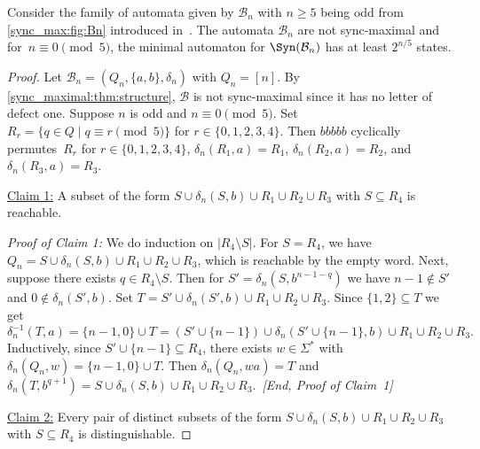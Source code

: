 \begin{theorem} \label{thm:Bn}
	Consider the family of automata given by $\mathcal B_n$ with $n \ge 5$ being odd from \cref{sync_max:fig:Bn}
	introduced in~\cite{AnaVolGus2013,AnanichevVZ07}.
	The automata $\mathcal B_n$ are not sync-maximal 
	and for~$n \equiv 0 \pmod{5}$, 
	the minimal automaton for $\Syn(\mathcal{B}_n)$ 
	has at least $2^{n / 5}$ states.
\end{theorem}
\begin{proof}
	Let $\mathcal{B}_n = (Q_n,\{a,b\},\delta_n)$ with $Q_n = [n]$.
	By \cref{sync_maximal:thm:structure},
	$\mathcal B$ is not sync-maximal since it has no letter of defect one.
	Suppose $n$ is odd and $n \equiv 0 \pmod{5}$.
	Set $R_r = \{ q \in Q \mid q \equiv r \pmod{5} \}$
	for $r \in \{0,1,2,3,4\}$.
	Then $bbbbb$ cyclically permutes~$R_r$ for $r \in \{0,1,2,3,4\}$,
	$\delta_n(R_1, a) = R_1$, $\delta_n(R_2, a) = R_2$, and $\delta_n(R_3, a) = R_3$.
	
	\medskip
	\noindent\underline{Claim 1:} A subset of the form
	$
	S \cup  \delta_n(S, b) \cup R_1 \cup R_2 \cup R_3
	$
	with $S \subseteq R_4$ is reachable.
		
	\medskip 	
	\noindent\emph{Proof of Claim 1:} We do induction on $|R_4 \setminus S|$.
	For $S = R_4$,
	we have $Q_n = S \cup  \delta_n(S, b) \cup R_1 \cup R_2 \cup R_3$,
	which is reachable by the empty word.
	Next, suppose there exists $q \in R_4 \setminus S$.
	Then for $S' = \delta_n(S, b^{n - 1 - q})$
	we have $n - 1 \notin S'$ and $0 \notin \delta_n(S', b)$.
	Set $T = S' \cup \delta_n(S', b) \cup R_1 \cup R_2 \cup R_3$.
	Since $\{1,2\} \subseteq T$ we get
	\[
	\delta_n^{-1}(T, a) = \{n-1, 0\} \cup T = (S' \cup \{n-1\}) \cup \delta_n(S' \cup \{n-1\}, b) \cup R_1 \cup R_2 \cup R_3.
	\]
	Inductively, since $S' \cup \{n-1\} \subseteq R_4$,
	there exists $w \in \Sigma^*$ with $\delta_n(Q_n, w) = \{ n - 1, 0 \} \cup T$.
	Then $\delta_n(Q_n, wa) = T$ and
	$
	\delta_n(T, b^{q + 1})
	= S \cup \delta_n(S, b) \cup R_1 \cup R_2 \cup R_3.
	$~\emph{[End, Proof of Claim~1]}	
			
	\medskip
	\noindent\underline{Claim 2:} Every pair of distinct subsets of the form
	$
	S \cup  \delta_n(S, b) \cup R_1 \cup R_2 \cup R_3
	$
	with $S \subseteq R_4$ is distinguishable.
	

\end{proof}
